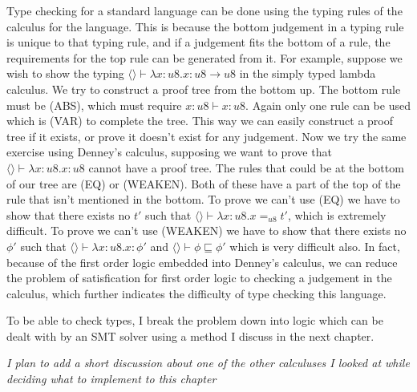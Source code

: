 Type checking for a standard language can be done using the typing rules of the calculus for the language.
This is because the bottom judgement in a typing rule is unique to that typing rule, and if a judgement
fits the bottom of a rule, the requirements for the top rule can be generated from it.
For example, suppose we wish to show the typing $\langle \rangle \vdash \lambda x: u8 . x: u8 \rightarrow u8$
in the simply typed lambda calculus.
We try to construct a proof tree from the bottom up.
The bottom rule must be (ABS), which must require $x:u8 \vdash x : u8$.
Again only one rule can be used which is (VAR) to complete the tree.
This way we can easily construct a proof tree if it exists, or prove it doesn't exist for any judgement.
Now we try the same exercise using Denney's calculus, supposing we want to prove that
$\langle \rangle \vdash \lambda x: u8 . x : u8$ cannot have a proof tree.
The rules that could be at the bottom of our tree are (EQ) or (WEAKEN).
Both of these have a part of the top of the rule that isn't mentioned in the bottom.
To prove we can't use (EQ) we have to show that there exists no $t'$ such that
$\langle \rangle \vdash \lambda x: u8 . x =_{u8} t'$, which is extremely difficult.
To prove we can't use (WEAKEN) we have to show that there exists no $\phi'$ such that
$\langle \rangle \vdash \lambda x: u8 . x : \phi'$ and $\langle \rangle \vdash \phi \sqsubseteq \phi'$
which is very difficult also.
In fact, because of the first order logic embedded into Denney's calculus, we can reduce the
problem of satisfication for first order logic to checking a judgement in the calculus, which
further indicates the difficulty of type checking this language.

To be able to check types, I break the problem down into logic which can be dealt with by an SMT
solver using a method I discuss in the next chapter.

\textit{I plan to add a short discussion about one of the other calculuses I looked at while deciding what to implement to this chapter}

